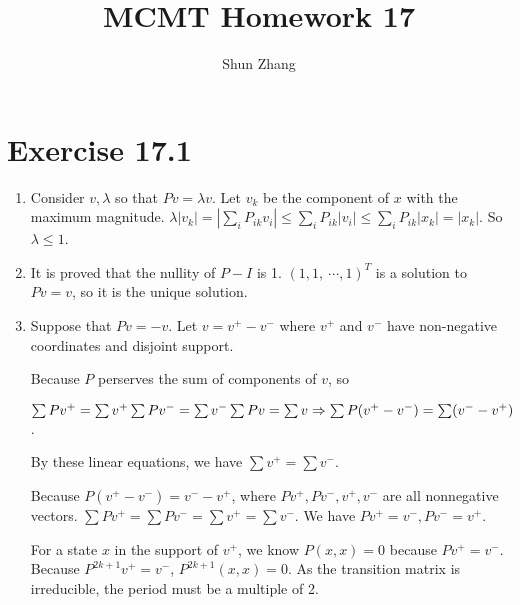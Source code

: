 \documentclass[10pt]{article}
\title{MCMT Homework 17}
\author{Shun Zhang}
\date{}
\begin{document}
\maketitle

\section*{Exercise 17.1}

\begin{enumerate}
\item Consider $v, \lambda$ so that $Pv = \lambda v$.
Let $v_k$ be the component of $x$ with the maximum magnitude.
$\lambda |v_k| = |\sum_i P_{ik} v_i| \leq \sum_i P_{ik} |v_i| \leq \sum_i P_{ik}
|x_k| = |x_k|$.
So $\lambda \leq 1$.

\item It is proved that the nullity of $P - I$ is 1. $(1,1,\
\cdots,1)^T$ is a solution to $Pv = v$, so it is the unique solution.

\item Suppose that $Pv=-v$. Let $v=v^+ - v^-$ where $v^+$ and $v^-$ have
non-negative coordinates and disjoint support.

Because $P$ perserves the sum of components of $v$, so

$\sum P v^+ = \sum v^+\\
\sum P v^- = \sum v^-\\
\sum P v = \sum v \Rightarrow \sum P(v^+ - v^-) = \sum (v^- - v^+)
$.

By these linear equations, we have $\sum v^+ = \sum v^-$.

Because $P(v^+ - v^-) = v^- - v^+$, where $P v^+, P v^-, v^+, v^-$ are all
nonnegative vectors. $\sum P v^+ = \sum P v^- = \sum v^+ = \sum v^-$. We have $P
v^+ = v^-, P v^- = v^+$.

For a state $x$ in the support of $v^+$, we know $P(x, x) = 0$ because $Pv^+ =
v^-$. Because $P^{2k+1}v^+ = v^-$, $P^{2k + 1}(x, x) = 0$. As the transition
matrix is irreducible, the period must be a multiple of 2.

\end{enumerate}
\end{document}
